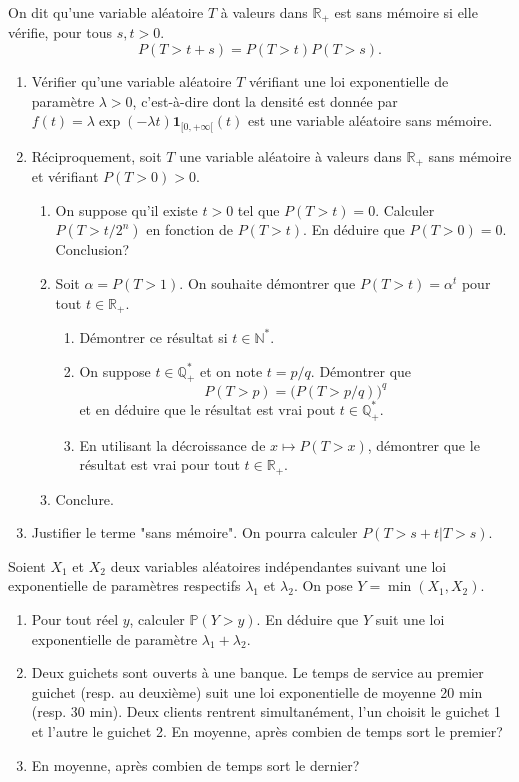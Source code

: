\documentclass[../PolyS4.tex]{subfiles}
\begin{document}
On dit qu'une variable aléatoire $T$ à valeurs dans $\mathbb R_+$ est sans mémoire si elle vérifie,
pour tous $s,t> 0.$
$$P(T> t+s)=P(T>t)P(T>s).$$
\begin{enumerate}
\item Vérifier qu'une variable aléatoire $T$ vérifiant une loi exponentielle de paramètre $\lambda>0$, c'est-à-dire
dont la densité est donnée par $f(t)=\lambda\exp(-\lambda t)\mathbf 1_{[0,+\infty[}(t)$ est une variable aléatoire sans mémoire.
\item Réciproquement, soit $T$ une variable aléatoire à valeurs dans $\mathbb R_+$ sans mémoire et vérifiant $P(T>0)>0$.
\begin{enumerate}
\item On suppose qu'il existe $t>0$ tel que $P(T>t)=0$. Calculer $P(T>t/2^n)$ en fonction de $P(T>t)$. En déduire que $P(T>0)=0$. Conclusion?
\item Soit $\alpha=P(T>1)$. On souhaite démontrer que $P(T>t)=\alpha^t$ pour tout $t\in\mathbb R_+$.
\begin{enumerate}
\item Démontrer ce résultat si $t\in\mathbb N^*$.
\item On suppose $t\in\mathbb Q_+^*$ et on note $t=p/q$. Démontrer que 
$$P(T>p)=\big(P(T>p/q)\big)^q$$
et en déduire que le résultat est vrai pout $t\in\mathbb Q_+^*$.
\item En utilisant la décroissance de $x\mapsto P(T>x)$, démontrer que le résultat est vrai pour tout $t\in\mathbb R_+$.
\end{enumerate}
\item Conclure.
\end{enumerate}
\item Justifier le terme "sans mémoire". On pourra calculer $P(T>s+t|T>s)$.\\
\end{enumerate}





Soient $X_1$ et $X_2$ deux variables aléatoires indépendantes suivant une loi exponentielle
de paramètres respectifs $\lambda_1$ et $\lambda_2$. On pose $Y=\min(X_1,X_2)$.
\begin{enumerate}
 \item Pour tout réel $y$, calculer $\mathbb P(Y>y)$. En déduire que $Y$ suit une loi exponentielle
de paramètre $\lambda_1+\lambda_2$.
\item Deux guichets sont ouverts à une banque. Le temps de service au premier guichet (resp. au deuxième) suit
une loi exponentielle de moyenne 20 min (resp. 30 min). Deux clients rentrent simultanément, l'un choisit le 
guichet 1 et l'autre le guichet 2. En moyenne, après combien de temps sort le premier?
\item En moyenne, après combien de temps sort le dernier?\\
\end{enumerate}
\end{document}
